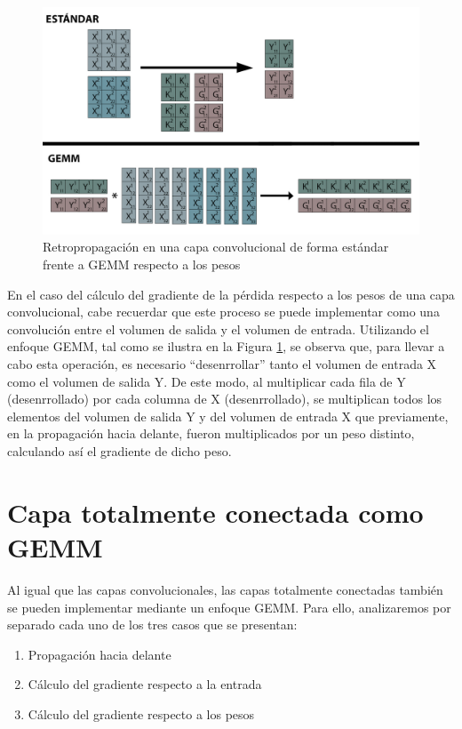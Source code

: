 \begin{figure}[H]
	\includegraphics[scale=0.33]{imagenes/conv_std_vs_gemm_backprop_pesos.jpg}  
	\caption{Retropropagación en una capa convolucional de forma estándar frente a GEMM respecto a los pesos}
	\label{fig:conv_std_vs_gemm_backprop_pesos}
\end{figure}

En el caso del cálculo del gradiente de la pérdida respecto a los pesos de una capa convolucional, cabe recuerdar que este proceso se puede implementar como una convolución entre el volumen de salida y el volumen de entrada. Utilizando el enfoque GEMM, tal como se ilustra en la Figura \ref{fig:conv_std_vs_gemm_backprop_pesos}, se observa que, para llevar a cabo esta operación, es necesario ``desenrrollar'' tanto el volumen de entrada X como el volumen de salida Y. De este modo, al multiplicar cada fila de Y (desenrrollado) por cada columna de X (desenrrollado), se multiplican todos los elementos del volumen de salida Y y del volumen de entrada X que previamente, en la propagación hacia delante, fueron multiplicados por un peso distinto, calculando así el gradiente de dicho peso.

\section{Capa totalmente conectada como GEMM \cite{nvidia_back_fully_GEMM}}

Al igual que las capas convolucionales, las capas totalmente conectadas también se pueden implementar mediante un enfoque GEMM. Para ello, analizaremos por separado cada uno de los tres casos que se presentan:
\begin{enumerate}[label=\textbullet, nosep]
	\item Propagación hacia delante
	\item Cálculo del gradiente respecto a la entrada
	\item Cálculo del gradiente respecto a los pesos
\end{enumerate}

